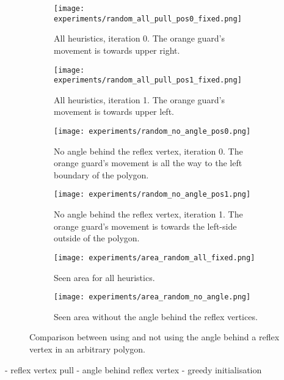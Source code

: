 \begin{figure}[h!]
    \centering
    \begin{subfigure}{0.45\textwidth}
        \texttt{[image: experiments/random\_all\_pull\_pos0\_fixed.png]}
        \caption{All heuristics, iteration 0. The orange guard's movement is towards upper right.}
        \label{fig:all_angle_pos0}
    \end{subfigure}
    \hfill
    \begin{subfigure}{0.45\textwidth}
        \texttt{[image: experiments/random\_all\_pull\_pos1\_fixed.png]}
        \caption{All heuristics, iteration 1. The orange guard's movement is towards upper left.}
        \label{fig:all_angle_pos1}
    \end{subfigure}
    \vfill
    \begin{subfigure}{0.45\textwidth}
        \texttt{[image: experiments/random\_no\_angle\_pos0.png]}
        \caption{No angle behind the reflex vertex, iteration 0. The orange guard's movement is all the way to the left boundary of the polygon.}
        \label{fig:no_angle_pos0}
    \end{subfigure}
    \hfill
    \begin{subfigure}{0.45\textwidth}
        \texttt{[image: experiments/random\_no\_angle\_pos1.png]}
        \caption{No angle behind the reflex vertex, iteration 1. The orange guard's movement is towards the left-side outside of the polygon.}
        \label{fig:no_angle_pos1}
    \end{subfigure}
    \vfill
    \begin{subfigure}{0.45\textwidth}
        \texttt{[image: experiments/area\_random\_all\_fixed.png]}
        \caption{Seen area for all heuristics.}
        \label{fig:area_all_angle}
    \end{subfigure}
    \hfill
    \begin{subfigure}{0.45\textwidth}
        \texttt{[image: experiments/area\_random\_no\_angle.png]}
        \caption{Seen area without the angle behind the reflex vertices.}
        \label{fig:area_no_angle}
    \end{subfigure}
    \caption{Comparison between using and not using the angle behind a reflex vertex in an arbitrary polygon.}
    \label{fig:no_angle}
\end{figure}
- reflex vertex pull
- angle behind reflex vertex
- greedy initialisation